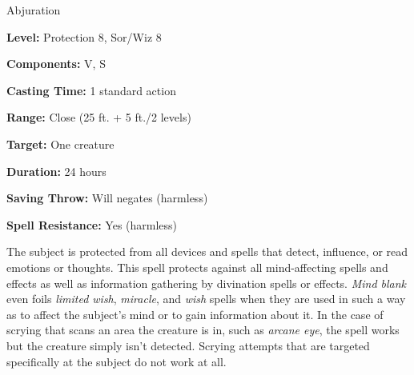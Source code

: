 
Abjuration

\textbf{Level:} Protection 8, Sor/Wiz 8

\textbf{Components:} V, S

\textbf{Casting Time:} 1 standard action

\textbf{Range:} Close (25 ft. + 5 ft./2 levels)

\textbf{Target:} One creature

\textbf{Duration:} 24 hours

\textbf{Saving Throw:} Will negates (harmless)

\textbf{Spell Resistance:} Yes (harmless)

The subject is protected from all devices and spells that detect, influence, or 
read emotions or thoughts. This spell protects against all mind-affecting spells 
and effects as well as information gathering by divination spells or effects. \textit{Mind 
blank} even foils \textit{limited wish}, \textit{miracle}, and \textit{wish} spells 
when they are used in such a way as to affect the subject's mind or to gain information 
about it. In the case of scrying that scans an area the creature is in, such as 
\textit{arcane eye}, the spell works but the creature simply isn't detected. Scrying 
attempts that are targeted specifically at the subject do not work at all.

